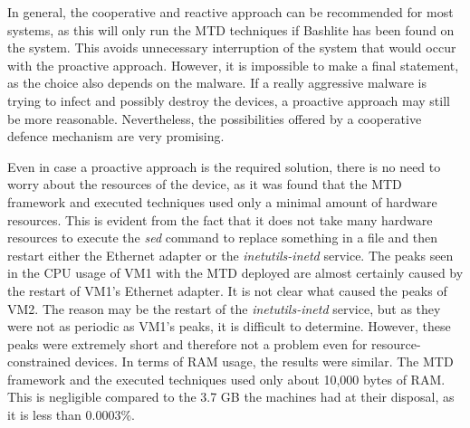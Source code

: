 In general, the cooperative and reactive approach can be recommended for most systems, as this will only run the MTD techniques if Bashlite has been found on the system. This avoids unnecessary interruption of the system that would occur with the proactive approach. However, it is impossible to make a final statement, as the choice also depends on the malware. If a really aggressive malware is trying to infect and possibly destroy the devices, a proactive approach may still be more reasonable. Nevertheless, the possibilities offered by a cooperative defence mechanism are very promising. 

Even in case a proactive approach is the required solution, there is no need to worry about the resources of the device, as it was found that the MTD framework and executed techniques used only a minimal amount of hardware resources. This is evident from the fact that it does not take many hardware resources to execute the \textit{sed} command to replace something in a file and then restart either the Ethernet adapter or the \textit{inetutils-inetd} service. The peaks seen in the CPU usage of VM1 with the MTD deployed are almost certainly caused by the restart of VM1's Ethernet adapter. It is not clear what caused the peaks of VM2. The reason may be the restart of the \textit{inetutils-inetd} service, but as they were not as periodic as VM1's peaks, it is difficult to determine.
However, these peaks were extremely short and therefore not a problem even for resource-constrained devices. In terms of RAM usage, the results were similar. The MTD framework and the executed techniques used only about 10,000 bytes of RAM. This is negligible compared to the 3.7 GB the machines had at their disposal, as it is less than 0.0003\%.


